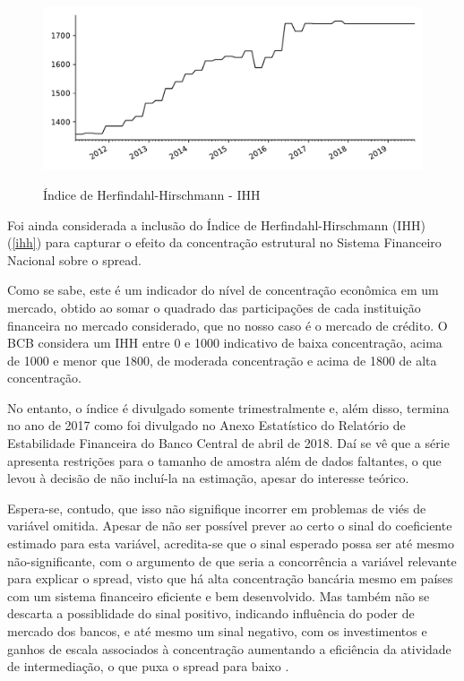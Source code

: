 \documentclass[a4paper,
               article,
               12pt,
               openany,
               oneside,
               english,
               brazil]{abntex2}
\numberwithin{equation}{section}
\begin{document}
    \begin{figure}[b]
        \centering
        \caption{Índice de Herfindahl-Hirschmann - IHH}
        \includegraphics[width = \textwidth, scale=0.75]{ihh.pdf}
        \label{ihh}
    \end{figure}

    Foi ainda considerada a inclusão do Índice de Herfindahl-Hirschmann (IHH) (\autoref{ihh}) para capturar o efeito da concentração estrutural no Sistema Financeiro Nacional sobre o spread. 
    
    Como se sabe, este é um indicador do nível de concentração econômica em um mercado, obtido ao somar o quadrado das participações de cada instituição financeira no mercado considerado, que no nosso caso é o mercado de crédito. O BCB considera um IHH entre 0 e 1000 indicativo de baixa concentração, acima de 1000 e menor que 1800, de moderada concentração e acima de 1800 de alta concentração.
    
    No entanto, o índice é divulgado somente trimestralmente e, além disso, termina no ano de 2017 como foi divulgado no Anexo Estatístico do Relatório de Estabilidade Financeira do Banco Central de abril de 2018. Daí se vê que a série apresenta restrições para o tamanho de amostra além de dados faltantes, o que levou à decisão de não incluí-la na estimação, apesar do interesse teórico.

    Espera-se, contudo, que isso não signifique incorrer em problemas de viés de variável omitida. Apesar de não ser possível prever ao certo o sinal do coeficiente estimado para esta variável, acredita-se que o sinal esperado possa ser até mesmo não-significante, com o argumento de que seria a concorrência a variável relevante para explicar o spread, visto que há alta concentração bancária mesmo em países com um sistema financeiro eficiente e bem desenvolvido. Mas também não se descarta a possiblidade do sinal positivo, indicando influência do poder de mercado dos bancos, e até mesmo um sinal negativo, com os investimentos e ganhos de escala associados à concentração aumentando a eficiência da atividade de intermediação, o que puxa o spread para baixo \cite{reb2017}. 
\end{document}
